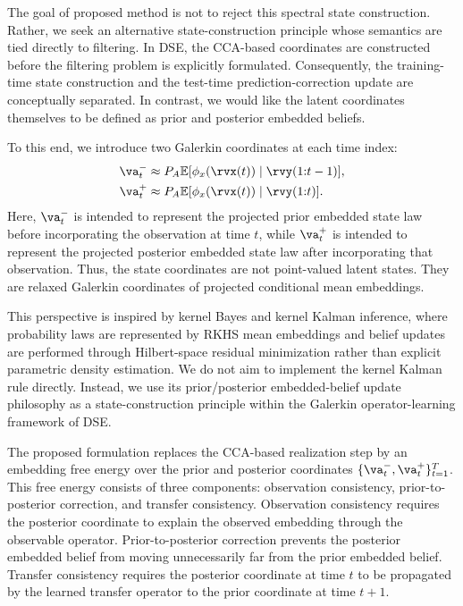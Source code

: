 \documentclass[twoside,11pt]{article}
\begin{document}
The goal of proposed method is not to reject this spectral state construction.
Rather, we seek an alternative state-construction principle whose
semantics are tied directly to filtering. In DSE, the CCA-based
coordinates are constructed before the filtering problem is explicitly
formulated. Consequently, the training-time state construction and the
test-time prediction-correction update are conceptually separated. In
contrast, we would like the latent coordinates themselves to be defined
as prior and posterior embedded beliefs.

To this end, we introduce two Galerkin coordinates at each time index:
\begin{align}
\va_t^-
&\approx
P_A
\mathbb E[
\phi_x(\rvx(t))
\mid
\rvy(1{:}t-1)
],
\label{eq:motivation_prior_coordinate}
\\
\va_t^+
&\approx
P_A
\mathbb E[
\phi_x(\rvx(t))
\mid
\rvy(1{:}t)
].
\label{eq:motivation_posterior_coordinate}
\end{align}
Here, $\va_t^-$ is intended to represent the projected prior embedded
state law before incorporating the observation at time $t$, while
$\va_t^+$ is intended to represent the projected posterior embedded
state law after incorporating that observation. Thus, the state
coordinates are not point-valued latent states. They are relaxed
Galerkin coordinates of projected conditional mean embeddings.

This perspective is inspired by kernel Bayes and kernel Kalman
inference, where probability laws are represented by RKHS mean
embeddings and belief updates are performed through Hilbert-space
residual minimization rather than explicit parametric density
estimation. We do not aim to implement the kernel Kalman rule directly.
Instead, we use its prior/posterior embedded-belief update philosophy as
a state-construction principle within the Galerkin operator-learning
framework of DSE.

The proposed formulation replaces the CCA-based realization step by an
embedding free energy over the prior and posterior coordinates
$\{\va_t^-,\va_t^+\}_{t=1}^T$. This free energy consists of three
components: observation consistency, prior-to-posterior correction, and
transfer consistency. Observation consistency requires the posterior
coordinate to explain the observed embedding through the observable
operator. Prior-to-posterior correction prevents the posterior embedded
belief from moving unnecessarily far from the prior embedded belief.
Transfer consistency requires the posterior coordinate at time $t$ to be
propagated by the learned transfer operator to the prior coordinate at
time $t+1$.
\end{document}
